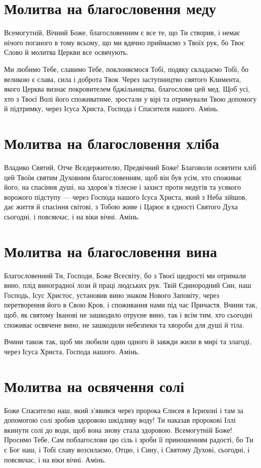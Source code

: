 \documentclass[chapters.tex]{subfiles}
\begin{document}
\section{Молитва на благословення меду}
Всемогутній, Вічний Боже, благословенним є все те, що Ти створив, і немає нічого поганого в тому всьому, що ми вдячно приймаємо з Твоїх рук, бо Твоє Слово й молитва Церкви все освячують.

Ми любимо Тебе, славимо Тебе, поклоняємося Тобі, подяку складаємо Тобі, бо великою є слава, сила і доброта Твоя. Через заступництво святого Климента, якого Церква визнає покровителем бджільництва, благослови цей мед. Щоб усі, хто з Твоєї Волі його споживатиме, зростали у вірі та отримували Твою допомогу й підтримку, через Ісуса Христа, Господа і Спасителя нашого. Амінь.

\section{Молитва на благословення хліба}
Владико Святий, Отче Вседержителю, Предвічний Боже! Благоволи освятити хліб цей Твоїм святим Духовним благословенням, щоб він був усім, хто споживає його, на спасіння душі, на здоров’я тілесне і захист проти недугів та усякого ворожого підступу — через Господа нашого Ісуса Христа, який з Неба зійшов, дає життя й спасіння світові, з Тобою живе і Царює в єдності Святого Духа сьогодні, і повсякчас, і на віки вічні. Амінь.

\section{Молитва на благословення вина}
Благословенний Ти, Господи, Боже Всесвіту, бо з Твоєї щедрості ми отримали вино, плід виноградної лози й праці людських рук. Твій Єдинородний Син, наш Господь, Ісус Христос, установив вино знаком Нового Заповіту, через перетворення його в Свою Кров, і споживання нами під час Причастя. Вчини так, щоб, як святому Іванові не зашкодило отруєне вино, так і всім тим, хто сьогодні споживає освячене вино, не зашкодили небезпеки та хвороби для душі й тіла.

Вчини також так, щоб ми любили один одного й завжди жили в мирі та злагоді, через Ісуса Христа, Господа нашого. Амінь.

\section{Молитва на освячення солі}
Боже Спасителю наш, який з’явився через пророка Єлисея в Ієрихоні і там за допомогою солі зробив здоровою шкідливу воду! Ти наказав пророкові Іллі вкинути солі до води, щоб вона знову стала здоровою. Всемогутній Боже! Просимо Тебе, Сам поблагослови цю сіль і зроби її приношенням радості, бо Ти є Бог наш, і Тобі славу возсилаємо, Отцю, і Сину, і Святому Духові, сьогодні, і повсякчас, і на віки вічні. Амінь.
\end{document}
